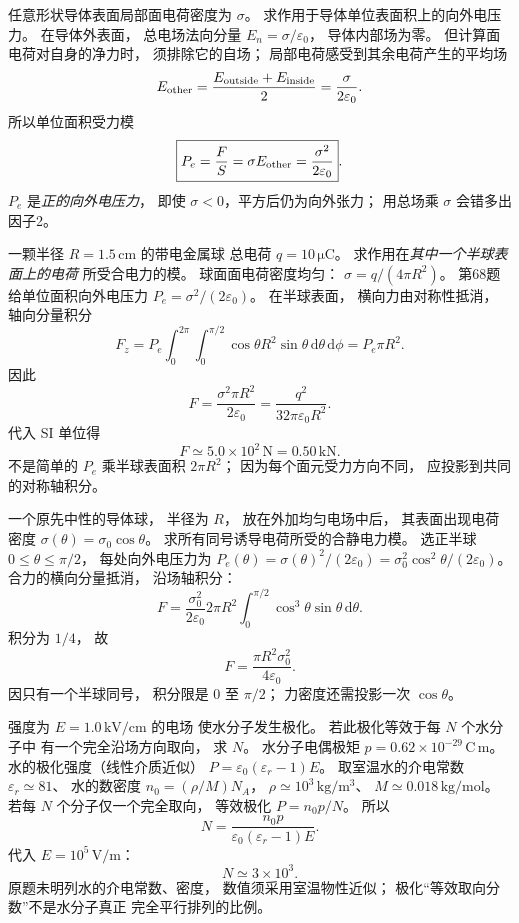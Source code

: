 任意形状导体表面局部面电荷密度为 $\sigma$。
求作用于导体单位表面积上的向外电压力。
\exsolution
在导体外表面，
总电场法向分量
$E_n=\sigma/\varepsilon_0$，
导体内部场为零。
但计算面电荷对自身的净力时，
须排除它的自场；
局部电荷感受到其余电荷产生的平均场
\[
E_{\rm other}=
\frac{E_{\rm outside}+E_{\rm inside}}2
=\frac{\sigma}{2\varepsilon_0}.
\]
所以单位面积受力模
\[
\boxed{P_e=\frac FS=
\sigma E_{\rm other}=
\frac{\sigma^2}{2\varepsilon_0}}.
\]
\excheck $P_e$ 是\emph{正的向外电压力}，
即使 $\sigma<0$，平方后仍为向外张力；
用总场乘 $\sigma$ 会错多出因子2。

一颗半径 $R=1.5\,\mathrm{cm}$ 的带电金属球
总电荷 $q=10\,\mathrm{\mu C}$。
求作用在\emph{其中一个半球表面上的电荷}
所受合电力的模。
\exsolution
球面面电荷密度均匀：
$\sigma=q/(4\pi R^2)$。
第68题给单位面积向外电压力
$P_e=\sigma^2/(2\varepsilon_0)$。
在半球表面，
横向力由对称性抵消，
轴向分量积分
\[
F_z=P_e
\int_0^{2\pi}\!\!\int_0^{\pi/2}
\cos\theta R^2\sin\theta\,\mathrm d\theta\,\mathrm d\phi
=P_e\pi R^2.
\]
因此
\[
\boxed{F=\frac{\sigma^2\pi R^2}{2\varepsilon_0}
=\frac{q^2}{32\pi\varepsilon_0R^2}}.
\]
代入 SI 单位得
\[
\boxed{F\simeq5.0\times10^2\,\mathrm N=0.50\,\mathrm{kN}}.
\]
\excheck 不是简单的 $P_e$ 乘半球表面积 $2\pi R^2$；
因为每个面元受力方向不同，
应投影到共同的对称轴积分。

一个原先中性的导体球，
半径为 $R$，
放在外加均匀电场中后，
其表面出现电荷密度
$\sigma(\theta)=\sigma_0\cos\theta$。
求所有同号诱导电荷所受的合静电力模。
\exsolution
选正半球
$0\le\theta\le\pi/2$，
每处向外电压力为
$P_e(\theta)=\sigma(\theta)^2/(2\varepsilon_0)
=\sigma_0^2\cos^2\theta/(2\varepsilon_0)$。
合力的横向分量抵消，
沿场轴积分：
\[
F=\frac{\sigma_0^2}{2\varepsilon_0}
2\pi R^2\int_0^{\pi/2}
\cos^3\theta\sin\theta\,\mathrm d\theta.
\]
积分为 $1/4$，
故
\[
\boxed{F=\frac{\pi R^2\sigma_0^2}{4\varepsilon_0}}.
\]
\excheck 因只有一个半球同号，
积分限是 $0$ 至 $\pi/2$；
力密度还需投影一次 $\cos\theta$。

强度为
$E=1.0\,\mathrm{kV/cm}$ 的电场
使水分子发生极化。
若此极化等效于每 $N$ 个水分子中
有一个完全沿场方向取向，
求 $N$。
水分子电偶极矩
$p=0.62\times10^{-29}\,\mathrm{C\,m}$。
\exsolution
水的极化强度（线性介质近似）
$P=\varepsilon_0(\varepsilon_r-1)E$。
取室温水的介电常数
$\varepsilon_r\simeq81$、
水的数密度
$n_0=(\rho/M)N_A$，
$\rho\simeq10^3\,\mathrm{kg/m^3}$、
$M\simeq0.018\,\mathrm{kg/mol}$。
若每 $N$ 个分子仅一个完全取向，
等效极化
$P=n_0p/N$。
所以
\[
\boxed{N=\frac{n_0p}
{\varepsilon_0(\varepsilon_r-1)E}}.
\]
代入 $E=10^5\,\mathrm{V/m}$：
\[
\boxed{N\simeq3\times10^3}.
\]
\excheck 原题未明列水的介电常数、密度，
数值须采用室温物性近似；
极化“等效取向分数”不是水分子真正
完全平行排列的比例。


